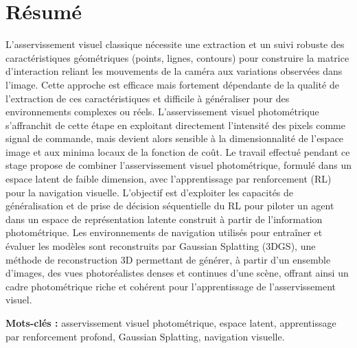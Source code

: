 \newpage
\section*{Résumé}

L'asservissement visuel classique nécessite une extraction et un suivi robuste des caractéristiques géométriques (points, lignes, contours) pour construire la matrice d'interaction reliant les mouvements de la caméra aux variations observées dans l'image. Cette approche est efficace mais fortement  dépendante de la qualité de l'extraction de ces caractéristiques et difficile à généraliser pour des environnements complexes  ou réels. L'asservissement visuel photométrique s'affranchit de cette étape en exploitant directement l'intensité des pixels comme signal de commande, mais devient alors sensible à la dimensionnalité de l'espace image et aux minima locaux de la fonction de coût.
Le  travail effectué pendant ce stage propose de combiner l'asservissement visuel photométrique, formulé dans un espace latent de faible dimension, avec l'apprentissage par renforcement (RL) pour la navigation visuelle. L'objectif est d'exploiter les capacités de généralisation et de prise de décision séquentielle du RL pour piloter un agent dans un espace de représentation latente construit à partir de l'information photométrique. Les environnements de navigation utilisés pour entraîner et évaluer les modèles  sont reconstruits par Gaussian Splatting (3DGS), une méthode de reconstruction 3D permettant de générer, à partir d'un ensemble d'images, des vues photoréalistes denses et continues d'une scène, offrant ainsi un cadre photométrique riche et cohérent pour l'apprentissage de l'asservissement visuel.

\vspace{0.5cm}
\textbf{Mots-clés :} asservissement visuel photométrique, espace latent, apprentissage par renforcement profond, Gaussian Splatting, navigation visuelle.

